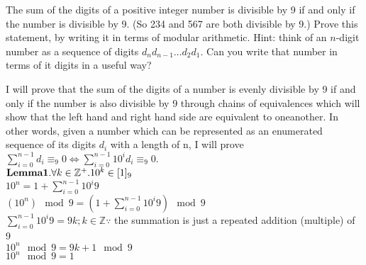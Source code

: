 \documentclass[solution,letterpaper]{cs20}
\begin{document}


    \begin{problem}
        The sum of the digits of a positive integer number is
        divisible by 9 if and only if the number is divisible by 9.  (So 234
        and 567 are both divisible by 9.)  Prove this statement, by writing
        it in terms of modular arithmetic.  Hint: think of an $n$-digit number
        as a sequence of digits $d_n d_{n-1} \ldots d_2 d_1$.  Can you write that
        number in terms of it digits in a useful way?

        \begin{solution}
            I will prove that the sum of the digits of a number is evenly divisible by 9 if and only if the number is also divisible by 9 through chains of equivalences which will show that the left hand and right hand side are equivalent to oneanother. In other words, given a number which can be represented as an enumerated sequence of its digits $d_i$ with a length of n, I will prove $\sum_{i=0}^{n-1}d_i \equiv_9 0 \iff \sum_{i=0}^{n-1} 10^{i}d_i \equiv_9 0$.\\

            $\bold{Lemma 1. } {\forall k \in \mathbb{Z}^{+}. 10^k \in [1]_9}$ \\
            $10^n = 1 + \sum_{i = 0}^{n-1} 10^{i}9$ \\
            $(10^n) \mod 9 = (1 + \sum_{i = 0}^{n-1} 10^{i}9) \mod 9$ \\
            $\sum_{i = 0}^{n-1} 10^{i}9 = 9k; k \in \mathbb{Z} \because$ the summation is just a repeated addition (multiple) of 9 \\
            $10^n \mod 9 = 9k + 1 \mod 9$ \\
            $10^n \mod 9 = 1$ \\


\end{solution}
\end{problem}
\end{document}
